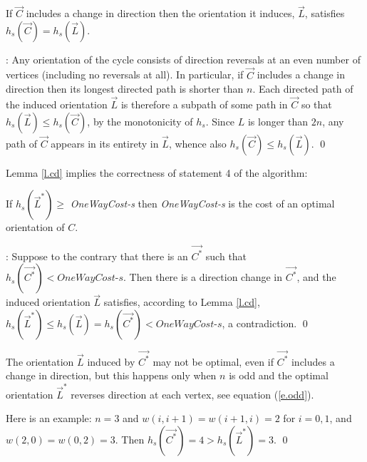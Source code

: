 \begin{lemma}\label{l.cd}
	If $\vec{C}$ includes a change in direction then the orientation it induces,  $\vec{L}$, satisfies $h_s(\vec{C})= h_s(\vec{L})$.
\end{lemma}
:
Any orientation of the cycle consists of direction reversals at an even number of vertices 
(including no reversals at all). In particular, if $\vec{C}$  includes a change in direction 
then its longest directed path is
shorter than $n$. Each directed path of the induced orientation $\vec{L}$ is therefore a subpath 
of some path in $\vec{C}$ so that $h_s(\vec{L}) \leq h_s(\vec{C})$, 
by the monotonicity of $h_s$. 
Since $L$ is longer than $2n$, any path of $\vec{C}$ appears in its entirety in $\vec{L}$,
whence also $h_s(\vec{C})\leq h_s(\vec{L})$. 
\qed

Lemma \ref{l.cd} implies the correctness of statement 4 of the algorithm:
\begin{lemma}
	If $h_s(\vec{L}^*) \geq$ \textit{OneWayCost-s} then \textit{OneWayCost-s} is the cost 
	of an optimal orientation of $C$. 
\end{lemma}
: Suppose to the contrary that there is an $\vec{C^*}$ such that 
$h_s(\vec{C^*})<\textit{OneWayCost-s}$. Then there is a direction change in 
$\vec{C^*}$, and the induced orientation $\vec{L}$ satisfies, according to Lemma \ref{l.cd},
$h_s(\vec{L}^*) \leq h_s(\vec{L}) =h_s(\vec{C^*}) <\textit{OneWayCost-s}$,
a contradiction.
\qed

\begin{remark} The orientation $\vec{L}$ induced 
	by $\vec{C^*}$ may not be optimal, even if $\vec{C^*}$ includes a change in direction,
	but this happens only when $n$ is odd and the optimal orientation $\vec{L}^*$ reverses 
	direction at each vertex, see equation (\ref{e.odd}). 
\end{remark}
Here is an example: $n=3$ and $w(i,i+1)=w(i+1,i)=2$ for $i=0,1$,
and  $w(2,0)=w(0,2)=3$. Then  $h_s(\vec{C^*})=4> h_s(\vec{L}^*)=3$.
\qed

